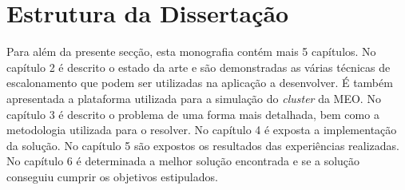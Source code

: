 \section{Estrutura da Dissertação} \label{sec:struct}
Para além da presente secção, esta monografia contém mais 5 capítulos. No capítulo 2 é descrito o estado da arte e são demonstradas as várias técnicas de escalonamento que podem ser utilizadas na aplicação a desenvolver. É também apresentada a plataforma utilizada para a simulação do \textit{cluster} da MEO. No capítulo 3 é descrito o problema de uma forma mais detalhada, bem como a metodologia utilizada para o resolver. No capítulo 4 é exposta a implementação da solução. No capítulo 5 são expostos os resultados das experiências realizadas. No capítulo 6 é determinada a melhor solução encontrada e se a solução conseguiu cumprir os objetivos estipulados.

